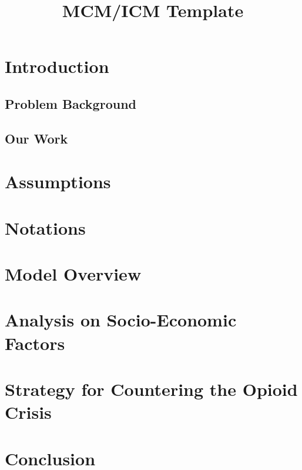 \documentclass[12pt]{article} %
\title{MCM/ICM Template}
\begin{document}
\cfoot{}
\maketitle
\thispagestyle{fancy}
\tableofcontents %
\newpage %


\section{Introduction} %
\subsection{Problem Background} %


\subsection{Our Work} %


\section{Assumptions} %


\section{Notations} %


\section{Model Overview} %


\section{Analysis on Socio-Economic Factors} 

\section{Strategy for Countering the Opioid Crisis}




\section{Conclusion} %
\end{document}
